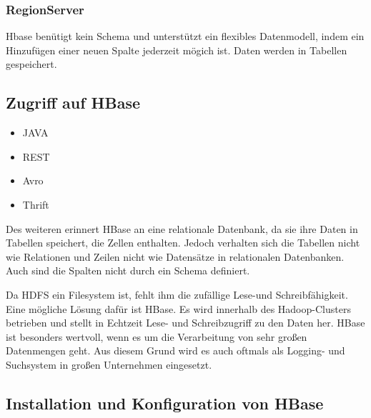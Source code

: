 \subsubsection{RegionServer}


Hbase benütigt kein Schema und unterstützt ein flexibles Datenmodell, indem ein Hinzufügen einer neuen Spalte jederzeit mögich ist. Daten werden in Tabellen gespeichert.

\subsection{Zugriff auf HBase}
\begin{itemize}

\item JAVA
\item REST
\item Avro
\item Thrift
\end{itemize}



Des weiteren erinnert HBase an eine relationale Datenbank, da sie ihre Daten in Tabellen speichert, die Zellen enthalten. Jedoch verhalten sich die Tabellen nicht wie Relationen und Zeilen nicht wie Datensätze in relationalen Datenbanken. Auch sind die Spalten nicht durch ein Schema definiert.

Da HDFS ein Filesystem ist, fehlt ihm die zufällige Lese-und Schreibfähigkeit. Eine mögliche Lösung dafür ist HBase. Es wird innerhalb des Hadoop-Clusters betrieben und stellt in Echtzeit Lese- und Schreibzugriff zu den Daten her. HBase ist besonders wertvoll, wenn es um die Verarbeitung von sehr großen Datenmengen geht. Aus diesem Grund wird es auch oftmals als Logging- und Suchsystem in großen Unternehmen eingesetzt.





\subsection{Installation und Konfiguration von HBase}